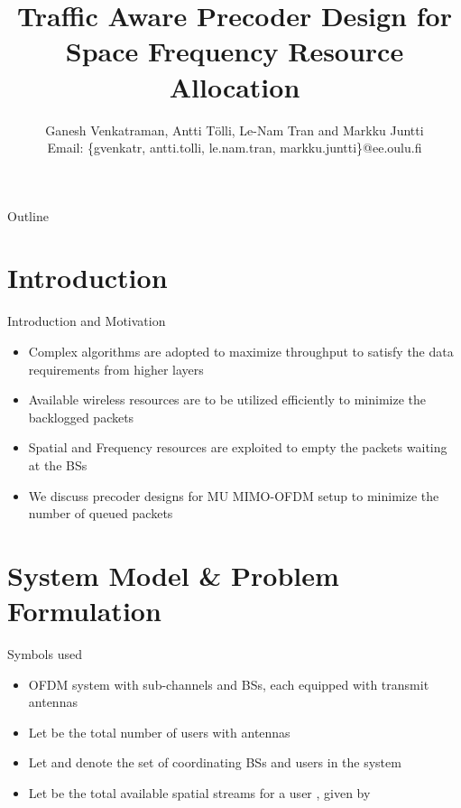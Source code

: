 \documentclass[9pt]{beamer}
\title{Traffic Aware Precoder Design for Space Frequency Resource Allocation}
\author{{Ganesh Venkatraman\eqn{^\dagger}, Antti T\"{o}lli, Le-Nam Tran and Markku Juntti} \\ \scriptsize{Email: \{gvenkatr, antti.tolli, le.nam.tran, markku.juntti\}@ee.oulu.fi}}
\begin{document}
\AtBeginSection{\frame{\sectionpage}}

\begin{frame}
    \titlepage
\end{frame}

\begin{frame}{Outline} \scriptsize
    \tableofcontents
\end{frame}

  

\section{Introduction}

\begin{frame}{Introduction and Motivation}
\begin{itemize}
\item Complex algorithms are adopted to maximize throughput to satisfy the data requirements from higher layers
\item Available wireless resources are to be utilized efficiently to minimize the backlogged packets 
\item Spatial and Frequency resources are exploited to empty the packets waiting at the \acp{BS}
\item We discuss precoder designs for \acl{MU} \acs{MIMO}-\acs{OFDM} setup to minimize the number of queued packets 
\end{itemize}
\end{frame}

\section{System Model \& Problem Formulation}

\begin{frame}{Symbols used}
\begin{itemize}
\item \acs{OFDM} system with  sub-channels and  \acp{BS}, each equipped with  transmit antennas
\item Let  be the total number of users with  antennas
\item Let  and  denote the set of coordinating \acp{BS} and users in the system
\item Let  be the total available spatial streams for a user , given by 
\end{itemize}
\end{frame}
\end{document}
